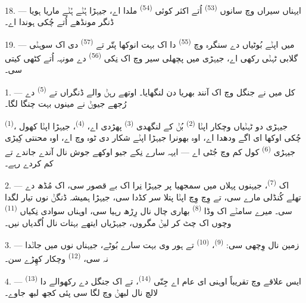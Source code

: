 18. --- ایہناں سیراں وچ سانوں  \textsuperscript{(53)} اُتے اکثر کوئی
 \textsuperscript{(54)} ملدا اے، جیہڑا ہُݨے ہُݨے ماریا ہویا
ڈنگر مونڈھے اُتے چُکی ہوندا اے۔

19. --- میں اپݨے بُوٹیاں دے سنگرہ وچ  \textsuperscript{(55)} دا اک بہت
انوکھا پتّر تے  \textsuperscript{(57)} دی اک سوہݨی گلابی ٹہݨی رکھی اے،
جیہڑی میں پچھلی سیر وچ اک نِکی  \textsuperscript{(56)} دے مونہہ اُتے
کٹھی کیتی سی۔

\VUsaut{3.0mm}
\VUsaut{3.0mm}

\VUsaut{3.0mm}

1. --- کل میں نے جنگل وچ اک آنند بھریا دن لنگھایا۔ اوتھے رہݨ والے ڈنگراں تے
 \textsuperscript{(5)} دے رُجھے جیوݨ نے مینوں بہت چنگا لگا۔

 \textsuperscript{(1)}، جیہڑی دو ٹہݨیاں وچکار اپݨا 
\textsuperscript{(2)} بُݨ کے لنگھدی  \textsuperscript{(3)} پھڑدی اے،
 \textsuperscript{(4)}، جیہڑا اپݨا کھول چُکی اوکھا ای اگے ودھدا اے،
اوہ بھونرا جیہڑا اپݨے شکار دی ٹوہ وچ اے، اوہ محنتی کِیڑی جیہڑی 
\textsuperscript{(6)} کول کم وچ جُٹی اے — ایہہ سارے نِکے جیو اوکھے جوش نال آندے
جاندے تے کم کردے رہے۔

2. --- اک  \textsuperscript{(7)}، جیہنوں پہلاں میں  سمجھیا
پر جیہڑا نِرا اک بے قصور  سی، اک مُڈھ دے تھلے کُنڈلی مارے سی،
تے وِچ وِچ اپݨا پتلا سر کڈدا سی، جیہڑا ہمیشہ ڈنگݨ نوں تیار لگدا سی۔ میرے سامݨے
اک وڈا  \textsuperscript{(8)} بھاری چال نال رِڑھ رہیا سی، اوہناں سوادی
نِکیاں  \textsuperscript{(11)} وچوں اک چٹ کر لیݨ مگروں،
جیہڑیاں ایتھے بہتات نال اُگدیاں نیں۔

3. --- زمین  نال وِچھی سی: 
\textsuperscript{(9)}،  \textsuperscript{(10)} تے ہور وی بہت سارے
بُوٹے، جیہناں نوں میں جاݨدا نہ سی،  \textsuperscript{(12)}
وچکار کھِڑے سن۔

4. --- ایس علاقے وچ  تقریباً اوہنی ای عام اے جِنّی 
\textsuperscript{(14)}، تے اک جنگل دے رکھوالے دا 
\textsuperscript{(13)} لالچ نال لبھݨ وچ لگا سی پئی کجھ لبھ جاوے۔

\VUsaut{3.0mm}
\VUsaut{3.0mm}

